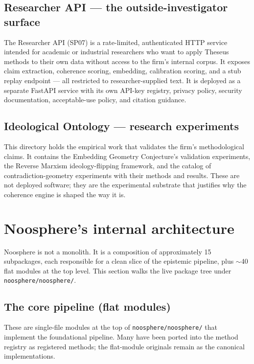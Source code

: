 \documentclass[11pt,letterpaper]{article}
\newcommand{\file}[1]{\texttt{#1}}
\begin{document}
\subsection{Researcher API --- the outside-investigator surface}

The Researcher API (SP07) is a rate-limited, authenticated HTTP service intended for academic or industrial researchers who want to apply Theseus methods to their own data without access to the firm's internal corpus. It exposes claim extraction, coherence scoring, embedding, calibration scoring, and a stub replay endpoint --- all restricted to researcher-supplied text. It is deployed as a separate FastAPI service with its own API-key registry, privacy policy, security documentation, acceptable-use policy, and citation guidance.

\subsection{Ideological Ontology --- research experiments}

This directory holds the empirical work that validates the firm's methodological claims. It contains the Embedding Geometry Conjecture's validation experiments, the Reverse Marxism ideology-flipping framework, and the catalog of contradiction-geometry experiments with their methods and results. These are not deployed software; they are the experimental substrate that justifies why the coherence engine is shaped the way it is.

\newpage
\section{Noosphere's internal architecture}

Noosphere is not a monolith. It is a composition of approximately 15 subpackages, each responsible for a clean slice of the epistemic pipeline, plus ${\sim}$40 flat modules at the top level. This section walks the live package tree under \file{noosphere/noosphere/}.

\subsection{The core pipeline (flat modules)}

These are single-file modules at the top of \file{noosphere/noosphere/} that implement the foundational pipeline. Many have been ported into the method registry as registered methods; the flat-module originals remain as the canonical implementations.
\end{document}
